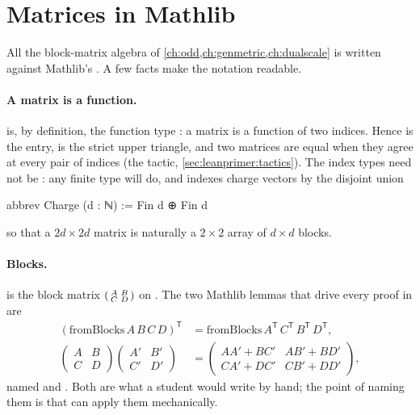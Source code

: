 \section{Matrices in Mathlib}\label{sec:leanprimer:matrices}

All the block-matrix algebra of \cref{ch:odd,ch:genmetric,ch:dualscale} is written against
Mathlib's . A few facts make the notation readable.

\paragraph{A matrix is a function.}
  is, by definition, the function
type : a matrix is a function of two indices. Hence  is the
entry,  is the strict upper triangle, and two
matrices are equal when they agree at every pair of indices (the  tactic,
\cref{sec:leanprimer:tactics}). The index types need not be : any finite type
will do, and  indexes charge vectors by the disjoint union
\begin{leancode}
abbrev Charge (d : ℕ) := Fin d ⊕ Fin d
\end{leancode}
so that a $2d\times2d$ matrix is naturally a $2\times2$ array of $d\times d$ blocks.

\paragraph{Blocks.}  is the block matrix
$\begin{psmallmatrix}A&B\\C&D\end{psmallmatrix}$ on . The two Mathlib
lemmas that drive every proof in  are
\begin{align}
(\mathrm{fromBlocks}\,A\,B\,C\,D)^{\mathsf T} &= \mathrm{fromBlocks}\,A^{\mathsf T}\,C^{\mathsf T}\,B^{\mathsf T}\,D^{\mathsf T},
\label{eq:leanprimer:fbT}\\
\begin{pmatrix}A&B\\C&D\end{pmatrix}\begin{pmatrix}A'&B'\\C'&D'\end{pmatrix}
&=\begin{pmatrix}AA'+BC' & AB'+BD'\\ CA'+DC' & CB'+DD'\end{pmatrix},
\label{eq:leanprimer:fbmul}
\end{align}
named  and . Both
are what a student would write by hand; the point of naming them is that  can
apply them mechanically.

